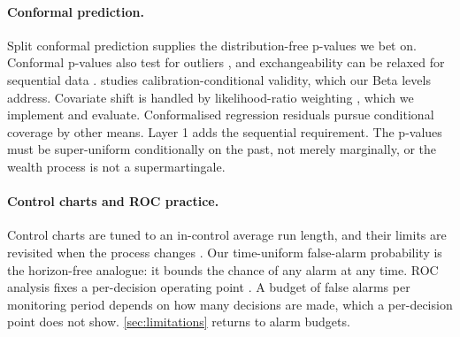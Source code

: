 \paragraph{Conformal prediction.}
Split conformal prediction \citep{vovk2005alrw,angelopoulos2023gentle} supplies the
distribution-free p-values we bet on. Conformal p-values also test for outliers
\citep{bates2023testing}, and exchangeability can be relaxed for sequential data
\citep{barber2023beyond,xu2023sequential}. \citet{vovk2012conditional} studies
calibration-conditional validity, which our Beta levels address. Covariate shift is
handled by likelihood-ratio weighting \citep{tibshirani2019covariate}, which we
implement and evaluate. Conformalised regression residuals \citep{lei2018distribution}
pursue conditional coverage by other means. Layer 1 adds the sequential requirement.
The p-values must be super-uniform conditionally on the past, not merely marginally,
or the wealth process is not a supermartingale.

\paragraph{Control charts and ROC practice.}
Control charts are tuned to an in-control average run length, and their limits are
revisited when the process changes \citep{montgomery2020introduction}. Our
time-uniform false-alarm probability is the horizon-free analogue: it bounds the
chance of any alarm at any time. ROC analysis fixes a per-decision operating point
\citep{fawcett2006introduction}. A budget of false alarms per monitoring period
depends on how many decisions are made, which a per-decision point does not show.
\cref{sec:limitations} returns to alarm budgets.
